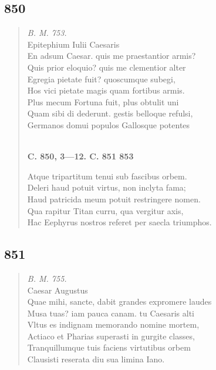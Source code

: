 \documentclass[11pt, a4paper]{report}
\begin{document}
            \subsection*{850}
      \begin{verse}
      \textit{B. M. 753.} \\ Epitephium Iulii Caesaris \\ En adsum Caesar. quis me praestantior armis? \\ Quis prior eloquio? quis me clementior alter \\ Egregia pietate fuit? quoscumque subegi, \\ Hos vici pietate magis quam fortibus armis. \\ Plus mecum Fortuna fuit, plus obtulit uni \\ Quam sibi di dederunt. gestis belloque refulsi, \\ Germanos domui populos Gallosque potentes \\ 
        ﻿\pagebreak 
    \begin{center} \textbf{C. 850, 3—12. C. 851 853} \end{center} \marginpar{[308]} Atque tripartitum tenui sub fascibus orbem. \\ Deleri haud potuit virtus, non inclyta fama; \\ Haud patricida meum potuit restringere nomen. \\ Qua rapitur Titan curru, qua vergitur axis, \\ Hac Eephyrus nostros referet per saecla triumphos. \\ 
      \end{verse}
  
            \subsection*{851}
      \begin{verse}
      \textit{B. M. 755.} \\ Caesar Augustus \\ Quae mihi, sancte, dabit grandes expromere laudes \\ Musa tuas? iam pauca canam. tu Caesaris alti \\ Vltus es indignam memorando nomine mortem, \\ Actiaco et Pharias superasti in gurgite classes, \\ Tranquillumque tuis faciens virtutibus orbem \\ Clausisti reserata diu sua limina Iano. \\ 
      \end{verse}
  
\end{document}
